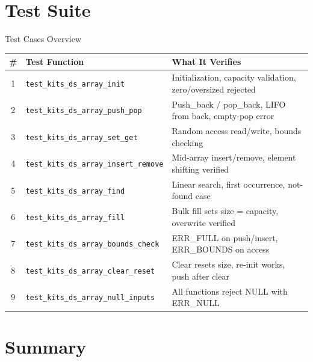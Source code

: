 \documentclass[aspectratio=169, 10pt]{beamer}
\begin{document}
\section{Test Suite}

\begin{frame}{Test Cases Overview}
\begin{table}
\centering
\small
\begin{tabular}{@{}clp{7cm}@{}}
\toprule
\textbf{\#} & \textbf{Test Function} & \textbf{What It Verifies} \\
\midrule
1 & \texttt{test\_kits\_ds\_array\_init}
  & Initialization, capacity validation, zero/oversized rejected \\
2 & \texttt{test\_kits\_ds\_array\_push\_pop}
  & Push\_back / pop\_back, LIFO from back, empty-pop error \\
3 & \texttt{test\_kits\_ds\_array\_set\_get}
  & Random access read/write, bounds checking \\
4 & \texttt{test\_kits\_ds\_array\_insert\_remove}
  & Mid-array insert/remove, element shifting verified \\
5 & \texttt{test\_kits\_ds\_array\_find}
  & Linear search, first occurrence, not-found case \\
6 & \texttt{test\_kits\_ds\_array\_fill}
  & Bulk fill sets size = capacity, overwrite verified \\
7 & \texttt{test\_kits\_ds\_array\_bounds\_check}
  & ERR\_FULL on push/insert, ERR\_BOUNDS on access \\
8 & \texttt{test\_kits\_ds\_array\_clear\_reset}
  & Clear resets size, re-init works, push after clear \\
9 & \texttt{test\_kits\_ds\_array\_null\_inputs}
  & All functions reject NULL with ERR\_NULL \\
\bottomrule
\end{tabular}
\end{table}
\end{frame}

\section{Summary}
\end{document}
